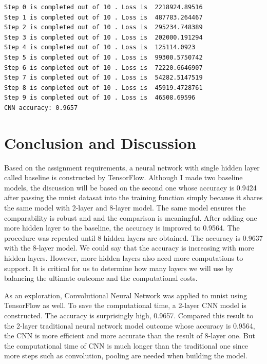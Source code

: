 \documentclass[11pt]{article}
\begin{document}
    \begin{Verbatim}[commandchars=\\\{\}]
Step 0 is completed out of 10 . Loss is  2218924.89516
Step 1 is completed out of 10 . Loss is  487783.264467
Step 2 is completed out of 10 . Loss is  295234.748389
Step 3 is completed out of 10 . Loss is  202000.191294
Step 4 is completed out of 10 . Loss is  125114.0923
Step 5 is completed out of 10 . Loss is  99300.5750742
Step 6 is completed out of 10 . Loss is  72220.6646907
Step 7 is completed out of 10 . Loss is  54282.5147519
Step 8 is completed out of 10 . Loss is  45919.4728761
Step 9 is completed out of 10 . Loss is  46508.69596
CNN accuracy: 0.9657

    \end{Verbatim}

    \hypertarget{conclusion-and-discussion}{%
\section{Conclusion and Discussion}\label{conclusion-and-discussion}}

    Based on the assignment requirements, a neural network with single
hidden layer called baseline is constructed by TensorFlow. Although I
made two baseline models, the discussion will be based on the second one
whose accuracy is 0.9424 after passing the mnist datasat into the
training function simply because it shares the same model with 2-layer
and 8-layer model. The same model ensures the comparability is robust
and and the comparison is meaningful. After adding one more hidden layer
to the baseline, the accuracy is improved to 0.9564. The procedure was
repeated until 8 hidden layers are obtained. The accuracy is 0.9637 with
the 8-layer model. We could say that the accuracy is increasing with
more hidden layers. However, more hidden layers also need more
computations to support. It is critical for us to determine how many
layers we will use by balancing the ultimate outcome and the
computational costs.

As an exploration, Convolutional Neural Network was applied to mnist
using TensorFlow as well. To save the computational time, a 2-layer CNN
model is constructed. The accuracy is surprisingly high, 0.9657.
Compared this result to the 2-layer traditional neural network model
outcome whose accuracy is 0.9564, the CNN is more efficient and more
accurate than the result of 8-layer one. But the computational time of
CNN is much longer than the traditional one since more steps such as
convolution, pooling are needed when building the model.
\end{document}
